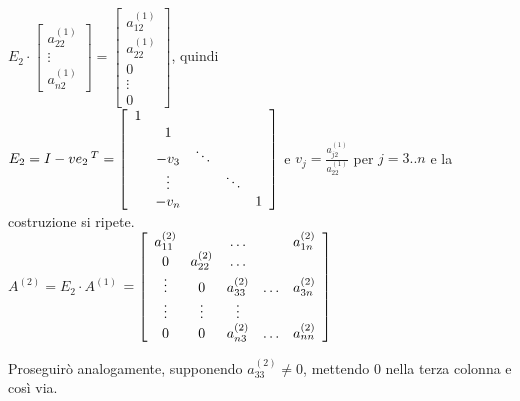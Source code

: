 \documentclass[10pt]{book}
\begin{document}
\begin{list}{}{}
\begin{math}
		E_2 \cdot \left[ \begin{array}{c}
	a_{22}^{(1)}\\\vdots\\a_{n2}^{(1)}
	\end{array} \right] = \left[ \begin{array}{c}
	a_{12}^{(1)}\\a_{22}^{(1)}\\0\\\vdots\\0
	\end{array} \right]	
	\end{math}, quindi\\
	\begin{math}
	E_2 = I - v e_2\,^T = \left[ \begin{array}{c c c c c}
		1 & & & & \\
		& 1 & &  &\\
		& -v_3 & \ddots & &\\
		& \vdots & & \ddots & \\
		& -v_n & & & 1
		\end{array} \right]
	\end{math}
	e $v_j = \frac{a_{j2}^{(1)}}{a_{22}^{(1)}}$ per $j = 3..n$ e la costruzione si ripete.\\
	$A^{(2)} = E_2 \cdot A^{(1)}$
	\begin{math}
	= \left[ \begin{array}{c c c c c}
	a_{11}^{(2)} & & \ldots & & a_{1n}^{(2)}\\
	0 &  a_{22}^{(2)} & \ldots & & \\
	\vdots & 0 &  a_{33}^{(2)} & \ldots & a_{3n}^{(2)} \\
	\vdots & \vdots & \vdots & & \\
	0 & 0 &  a_{n3}^{(2)} & \ldots & a_{nn}^{(2)} \\
	\end{array} \right]
	\end{math}
	\item Proseguirò analogamente, supponendo $a_{33}^{(2)} \neq 0$, mettendo 0 nella terza colonna e così via.
\end{list}
\end{document}
